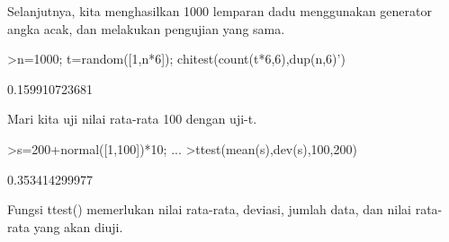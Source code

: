\documentclass[a4paper,10pt]{article}
\begin{document}
\begin{eulernotebook}
\begin{eulercomment}
\begin{eulercomment}
\begin{eulercomment}
\begin{eulercomment}
\begin{eulercomment}
\begin{eulercomment}
\begin{eulercomment}
\begin{eulercomment}
\begin{eulercomment}
\begin{eulercomment}
\begin{eulercomment}
\begin{eulercomment}
\begin{eulercomment}
\begin{eulercomment}
\begin{eulercomment}
\begin{eulercomment}
\begin{eulercomment}
\begin{eulercomment}
\begin{eulercomment}
\begin{eulercomment}
\begin{eulercomment}
\begin{eulercomment}
\begin{eulercomment}
\begin{eulercomment}
\begin{eulercomment}
\begin{eulercomment}
\begin{eulercomment}
\begin{eulercomment}
\begin{eulercomment}
\begin{eulercomment}
\begin{eulercomment}
\begin{eulercomment}
\begin{eulercomment}
Selanjutnya, kita menghasilkan 1000 lemparan dadu menggunakan
generator angka acak, dan melakukan pengujian yang sama.
\end{eulercomment}
\begin{eulerprompt}
>n=1000; t=random([1,n*6]); chitest(count(t*6,6),dup(n,6)')
\end{eulerprompt}
\begin{euleroutput}
  0.159910723681
\end{euleroutput}
\begin{eulercomment}
Mari kita uji nilai rata-rata 100 dengan uji-t.
\end{eulercomment}
\begin{eulerprompt}
>s=200+normal([1,100])*10; ...
>ttest(mean(s),dev(s),100,200)
\end{eulerprompt}
\begin{euleroutput}
  0.353414299977
\end{euleroutput}
\begin{eulercomment}
Fungsi ttest() memerlukan nilai rata-rata, deviasi, jumlah data, dan
nilai rata-rata yang akan diuji.


\end{eulercomment}
\end{eulercomment}
\end{eulercomment}
\end{eulercomment}
\end{eulercomment}
\end{eulercomment}
\end{eulercomment}
\end{eulercomment}
\end{eulercomment}
\end{eulercomment}
\end{eulercomment}
\end{eulercomment}
\end{eulercomment}
\end{eulercomment}
\end{eulercomment}
\end{eulercomment}
\end{eulercomment}
\end{eulercomment}
\end{eulercomment}
\end{eulercomment}
\end{eulercomment}
\end{eulercomment}
\end{eulercomment}
\end{eulercomment}
\end{eulercomment}
\end{eulercomment}
\end{eulercomment}
\end{eulercomment}
\end{eulercomment}
\end{eulercomment}
\end{eulercomment}
\end{eulercomment}
\end{eulercomment}
\end{eulernotebook}
\end{document}
